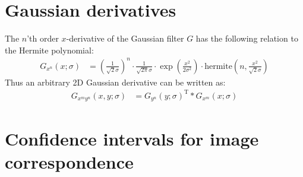 \documentclass[thesis.tex]{subfiles}
\begin{document}
\chapter{Gaussian derivatives}
%
The $n$'th order $x$-derivative of the Gaussian filter $G$ has the following relation to the Hermite polynomial:
%
\begin{align*}
	G_{x^n}(x;\sigma) &= \left(\frac{1}{\sqrt{2}\sigma}\right)^n \cdot
						 \frac{1}{\sqrt{2\pi}\sigma} \cdot
						 \exp \left( \frac{x^2}{2\sigma^2} \right) \cdot
						 \text{hermite} \left(n,\frac{x^2}{\sqrt{2}\sigma} \right)
\end{align*}
%
Thus an arbitrary 2D Gaussian derivative can be written as:
%
\begin{align*}
	G_{x^m y^n}(x,y;\sigma) &=
						G_{y^n}(y;\sigma)^\text{T} \ast G_{x^m}(x;\sigma)
\end{align*}

\chapter{Confidence intervals for image correspondence}
\end{document}
